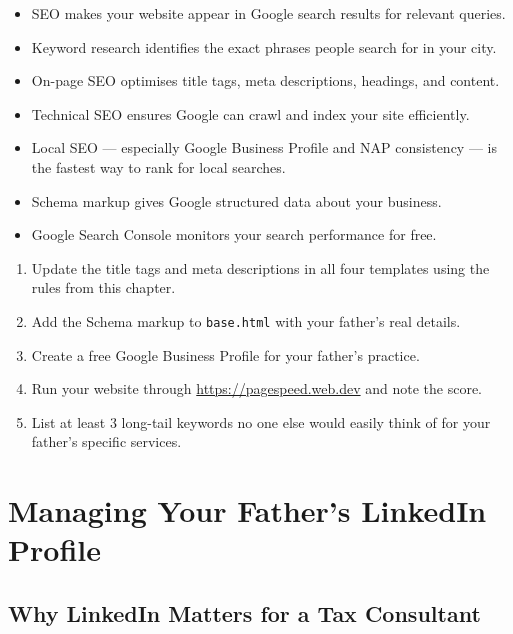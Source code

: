 \documentclass[12pt, a4paper]{book}
\begin{document}
\begin{tcolorbox}[learnedbox]
\begin{itemize}
  \item SEO makes your website appear in Google search results for relevant queries.
  \item Keyword research identifies the exact phrases people search for in your city.
  \item On-page SEO optimises title tags, meta descriptions, headings, and content.
  \item Technical SEO ensures Google can crawl and index your site efficiently.
  \item Local SEO --- especially Google Business Profile and NAP consistency --- is the fastest way to rank for local searches.
  \item Schema markup gives Google structured data about your business.
  \item Google Search Console monitors your search performance for free.
\end{itemize}
\end{tcolorbox}

\begin{tcolorbox}[taskbox]
\begin{enumerate}
  \item Update the title tags and meta descriptions in all four templates using the rules from this chapter.
  \item Add the Schema markup to \texttt{base.html} with your father's real details.
  \item Create a free Google Business Profile for your father's practice.
  \item Run your website through \url{https://pagespeed.web.dev} and note the score.
  \item List at least 3 long-tail keywords no one else would easily think of for your father's specific services.
\end{enumerate}
\end{tcolorbox}


\chapter{Managing Your Father's LinkedIn Profile}

\section{Why LinkedIn Matters for a Tax Consultant}
\end{document}
